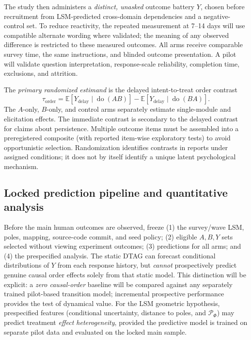 \documentclass[journal,10pt]{IEEEtran}
\newcommand{\EE}{\mathbb{E}}
\newcommand{\Ph}{\Phi}
\newcommand{\Do}{\operatorname{do}}
\begin{document}
The study then administers a \emph{distinct, unasked} outcome battery $Y$, chosen before recruitment from LSM-predicted cross-domain dependencies and a negative-control set. To reduce reactivity, the repeated measurement at 7--14 days will use compatible alternate wording where validated; the meaning of any observed difference is restricted to these measured outcomes. All arms receive comparable survey time, the same instructions, and blinded outcome presentation. A pilot will validate question interpretation, response-scale reliability, completion time, exclusions, and attrition.

The \emph{primary randomized estimand} is the delayed intent-to-treat order contrast
\begin{equation}
\tau_{\mathrm{order}}=
\EE[Y_{\mathrm{delay}}\mid\Do(AB)]-
\EE[Y_{\mathrm{delay}}\mid\Do(BA)].
\label{eq:tau}
\end{equation}
The $A$-only, $B$-only, and control arms separately estimate single-module and elicitation effects. The immediate contrast is secondary to the delayed contrast for claims about persistence. Multiple outcome items must be assembled into a preregistered composite (with reported item-wise exploratory tests) to avoid opportunistic selection. Randomization identifies contrasts in reports under assigned conditions; it does not by itself identify a unique latent psychological mechanism.

\subsection{Locked prediction pipeline and quantitative analysis}
Before the main human outcomes are observed, freeze (1) the survey/wave LSM, poles, mapping, source-code commit, and seed policy; (2) eligible $A,B,Y$ sets selected without viewing experiment outcomes; (3) predictions for all arms; and (4) the prespecified analysis. The static DTAG can forecast conditional distributions of $Y$ from each response history, but \emph{cannot} prospectively predict genuine causal order effects solely from that static model. This distinction will be explicit: a \emph{zero causal-order} baseline will be compared against any separately trained pilot-based transition model; incremental prospective performance provides the test of dynamical value. For the LSM geometric hypothesis, prespecified features (conditional uncertainty, distance to poles, and $\mathcal P_\Ph$) may predict treatment \emph{effect heterogeneity}, provided the predictive model is trained on separate pilot data and evaluated on the locked main sample.
\end{document}
